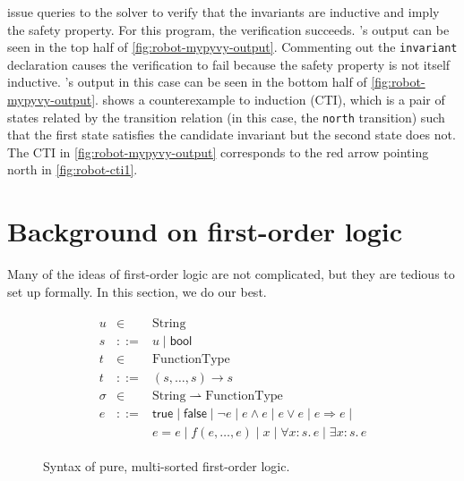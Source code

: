   issue queries to the solver to verify that the invariants
  are inductive and imply the safety property.
For this program, the verification succeeds.
\mypyvy's output can be seen in
  the top half of \cref{fig:robot-mypyvy-output}.
Commenting out the \lstinline[language=mypyvy]{invariant} declaration
  causes the verification to fail
  because the safety property is not itself inductive.
\mypyvy's output in this case can be seen in
  the bottom half of \cref{fig:robot-mypyvy-output}.
\mypyvy shows a counterexample to induction (CTI),
  which is a pair of states related by the transition relation
  (in this case, the \texttt{north} transition)
  such that the first state satisfies the candidate invariant
  but the second state does not.
The CTI in \cref{fig:robot-mypyvy-output} corresponds
  to the red arrow pointing north in \cref{fig:robot-cti1}.

\section{Background on first-order logic}\label{sec:fol-background}


Many of the ideas of first-order logic are not complicated,
  but they are tedious to set up formally.
In this section, we do our best.

\begin{figure}[t]
  \begin{gather*}
  \begin{array}{rcl}
    u &\in& \mathrm{String}\\
    s &::=& u \mid \mathsf{bool}\\
    t &\in& \mathrm{FunctionType}\\
    t &::=& (s,\dots,s) \to s\\
    \sigma &\in&  \mathrm{String} \rightharpoonup \mathrm{FunctionType}\\
    e &::=& \mathsf{true} \mid \mathsf{false} \mid \lnot e\mid e\land e\mid e\lor e \mid e \Rightarrow e \mid \\
      &   & e = e \mid f(e,\dots,e) \mid x \mid \forall x : s.\, e \mid \exists x : s.\, e
  \end{array}
  \end{gather*}
  \caption{Syntax of pure, multi-sorted first-order logic.}
  \label{fig:fol-syntax}
\end{figure}


